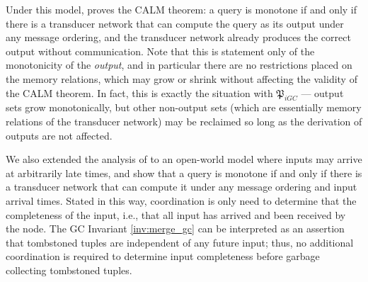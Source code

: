 Under this model, \cite{ameloot2013relational} proves the CALM theorem: a query is monotone if and only if there is a transducer network that can compute the query as its output under any message ordering, and the transducer network already produces the correct output without communication.
Note that this is statement only of the monotonicity of the \emph{output}, and in particular there are no restrictions placed on the memory relations, which may grow or shrink without affecting the validity of the CALM theorem.
In fact, this is exactly the situation with $\mathfrak{P}_{iGC}$ --- output sets grow monotonically, but other non-output sets (which are essentially memory relations of the transducer network) may be reclaimed so long as the derivation of outputs are not affected.


We also extended the analysis of \cite{ameloot2013relational} to an open-world model where inputs may arrive at arbitrarily late times, and show that a query is monotone if and only if there is a transducer network that can compute it under any message ordering and input arrival times.
Stated in this way, coordination is only need to determine that the completeness of the input, i.e., that all input has arrived and been received by the node.
The GC Invariant \ref{inv:merge_gc} can be interpreted as an assertion that tombstoned tuples are independent of any future input;
thus, no additional coordination is required to determine input completeness before garbage collecting tombstoned tuples.


